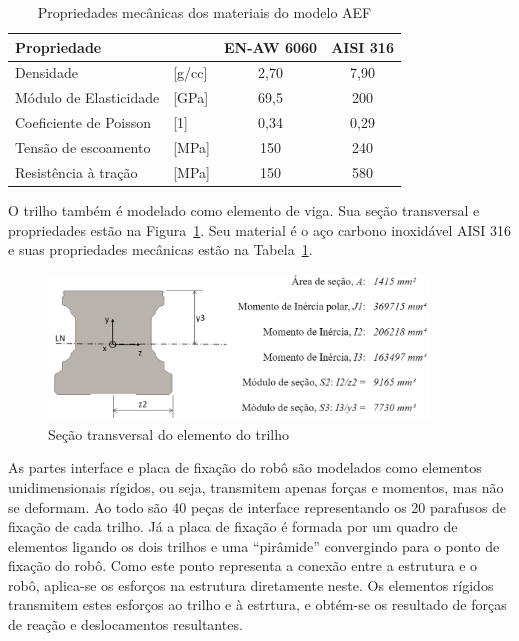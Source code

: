 \begin{table}
\centering
\caption{Propriedades mecânicas dos materiais do modelo AEF}
\label{tab::prop_mat}
\begin{tabular}{@{}llcc@{}}
\toprule
\textbf{Propriedade}   &             & \textbf{EN-AW 6060} & \textbf{AISI 316} \\ \midrule
Densidade              & {[}g/cc{]}  & 2,70                & 7,90             \\
Módulo de Elasticidade & {[}GPa{]}   & 69,5                & 200               \\
Coeficiente de Poisson & {[}1{]}     & 0,34                & 0,29    			\\
Tensão de escoamento   & {[}MPa{]}   & 150                 & 240               \\
Resistência à tração   & {[}MPa{]}   & 150                 & 580               \\ \bottomrule
\end{tabular}
\end{table}

O trilho também é modelado como elemento de viga. Sua seção transversal e
propriedades estão na Figura~\ref{fig::sectran_trilho}. Seu material é o aço
carbono inoxidável AISI 316 e suas propriedades mecânicas estão na
Tabela~\ref{tab::prop_mat}.

\begin{figure}[h]
	\centering 
 	\includegraphics[width=0.90\textwidth]{figs/sectran_trilho}
 	\caption{Seção transversal do elemento do trilho}
 	\label{fig::sectran_trilho}
\end{figure}

As partes interface e placa de fixação do robô são modelados como elementos
unidimensionais rígidos, ou seja, transmitem apenas forças e momentos, mas não
se deformam. Ao todo são 40 peças de interface representando os 20 parafusos de
fixação de cada trilho. Já a placa de fixação é formada por um quadro de
elementos ligando os dois trilhos e uma ``pirâmide'' convergindo para o ponto de
fixação do robô. Como este ponto representa a conexão entre a estrutura e o
robô, aplica-se os esforços na estrutura diretamente neste. Os elementos
rígidos transmitem estes esforços ao trilho e à estrtura, e obtém-se os
resultado de forças de reação e deslocamentos resultantes.


